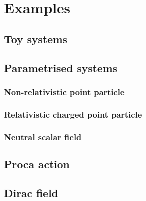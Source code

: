 \documentclass[a4paper,10pt]{article}
\begin{document}
\section{Examples}




\subsection{Toy systems}

\subsection{Parametrised systems}

\subsubsection{Non-relativistic point particle}

\subsubsection{Relativistic charged point particle}

\subsubsection{Neutral scalar field}

\subsection{Proca action}

\subsection{Dirac field}
\end{document}
